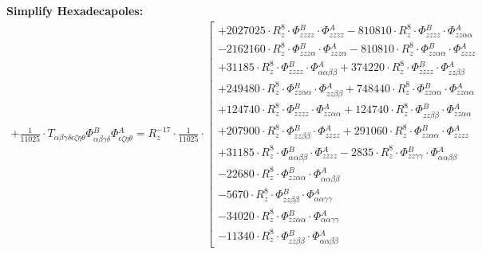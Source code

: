 \documentclass{article}
\begin{document}
\textbf{Simplify Hexadecapoles:}
\begin{subequations}\begin{gather}
+ \frac{1}{11025} \cdot T_{\alpha{}\beta{}\gamma{}\delta{}\epsilon{}\zeta{}\eta{}\theta{}} \Phi{}^{B}_{\alpha{}\beta{}\gamma{}\delta{}} \Phi{}^{A}_{\epsilon{}\zeta{}\eta{}\theta{}} = R_{z}^{-17} \cdot \frac{1}{11025} \cdot  \left[ \begin{array}{c} 
 		+ 2027025 \cdot R_{z}^{8} \cdot \Phi{}^{B}_{zzzz} \cdot \Phi{}^{A}_{zzzz}- 810810 \cdot R_{z}^{8} \cdot \Phi{}^{B}_{zzzz} \cdot \Phi{}^{A}_{zz\alpha{}\alpha{}} 
 \\[0.2em] 		 - 2162160 \cdot R_{z}^{8} \cdot \Phi{}^{B}_{zzz\alpha{}} \cdot \Phi{}^{A}_{zzz\alpha{}}- 810810 \cdot R_{z}^{8} \cdot \Phi{}^{B}_{zz\alpha{}\alpha{}} \cdot \Phi{}^{A}_{zzzz} 
 \\[0.2em] 		 + 31185 \cdot R_{z}^{8} \cdot \Phi{}^{B}_{zzzz} \cdot \Phi{}^{A}_{\alpha{}\alpha{}\beta{}\beta{}}+ 374220 \cdot R_{z}^{8} \cdot \Phi{}^{B}_{zzzz} \cdot \Phi{}^{A}_{zz\beta{}\beta{}} 
 \\[0.2em] 		 + 249480 \cdot R_{z}^{8} \cdot \Phi{}^{B}_{zz\alpha{}\alpha{}} \cdot \Phi{}^{A}_{zz\beta{}\beta{}}+ 748440 \cdot R_{z}^{8} \cdot \Phi{}^{B}_{zz\alpha{}\alpha{}} \cdot \Phi{}^{A}_{zz\alpha{}\alpha{}} 
 \\[0.2em] 		 + 124740 \cdot R_{z}^{8} \cdot \Phi{}^{B}_{zzzz} \cdot \Phi{}^{A}_{zz\alpha{}\alpha{}}+ 124740 \cdot R_{z}^{8} \cdot \Phi{}^{B}_{zz\beta{}\beta{}} \cdot \Phi{}^{A}_{zz\alpha{}\alpha{}} 
 \\[0.2em] 		 + 207900 \cdot R_{z}^{8} \cdot \Phi{}^{B}_{zz\beta{}\beta{}} \cdot \Phi{}^{A}_{zzzz}+ 291060 \cdot R_{z}^{8} \cdot \Phi{}^{B}_{zz\alpha{}\alpha{}} \cdot \Phi{}^{A}_{zzzz} 
 \\[0.2em] 		 + 31185 \cdot R_{z}^{8} \cdot \Phi{}^{B}_{\alpha{}\alpha{}\beta{}\beta{}} \cdot \Phi{}^{A}_{zzzz}- 2835 \cdot R_{z}^{8} \cdot \Phi{}^{B}_{zz\gamma{}\gamma{}} \cdot \Phi{}^{A}_{\alpha{}\alpha{}\beta{}\beta{}} 
 \\[0.2em] 		 - 22680 \cdot R_{z}^{8} \cdot \Phi{}^{B}_{zz\alpha{}\alpha{}} \cdot \Phi{}^{A}_{\alpha{}\alpha{}\beta{}\beta{}} 
 \\[0.2em] 		 - 5670 \cdot R_{z}^{8} \cdot \Phi{}^{B}_{zz\beta{}\beta{}} \cdot \Phi{}^{A}_{\alpha{}\alpha{}\gamma{}\gamma{}} 
 \\[0.2em] 		 - 34020 \cdot R_{z}^{8} \cdot \Phi{}^{B}_{zz\alpha{}\alpha{}} \cdot \Phi{}^{A}_{\alpha{}\alpha{}\gamma{}\gamma{}} 
 \\[0.2em] 		 - 11340 \cdot R_{z}^{8} \cdot \Phi{}^{B}_{zz\beta{}\beta{}} \cdot \Phi{}^{A}_{\alpha{}\alpha{}\beta{}\beta{}} 

\end{array}
\end{gather}
\end{subequations}
\end{document}
